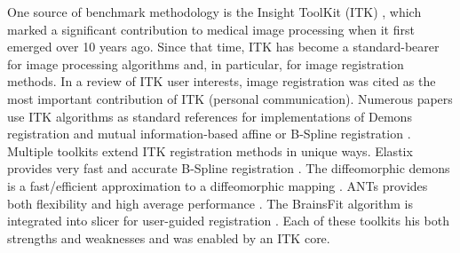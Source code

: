 \documentclass{llncs}
\begin{document}





One source of benchmark methodology is the Insight ToolKit (ITK)
\cite{Yoo2002,Ackerman2003}, which marked a significant contribution to
medical image processing when it first emerged over 10 years ago.
Since that time, ITK has become a standard-bearer for image
processing algorithms and, in particular, for image registration
methods.  In a review of ITK user interests, image registration was cited as the most important
contribution of ITK (personal communication).  Numerous papers use ITK
algorithms as standard references for implementations of Demons
registration and mutual information-based affine or B-Spline
registration \cite{2004,Shelton2005,Floca2007,Chen2008,Cheung2009}.
Multiple toolkits extend ITK registration methods in unique ways.
Elastix provides very fast and accurate B-Spline registration
\cite{Klein2010,Murphy2011}.  The diffeomorphic demons is a fast/efficient
approximation to a diffeomorphic mapping \cite{Vercauteren2009}.  
ANTs provides both flexibility and high average performance
\cite{Avants2011}.  The BrainsFit algorithm is integrated into slicer
for user-guided registration \cite{Kikinis2011}.
Each of these toolkits his both strengths and weaknesses
\cite{Klein2010,Murphy2011} and was enabled by an ITK core.    
\end{document}
